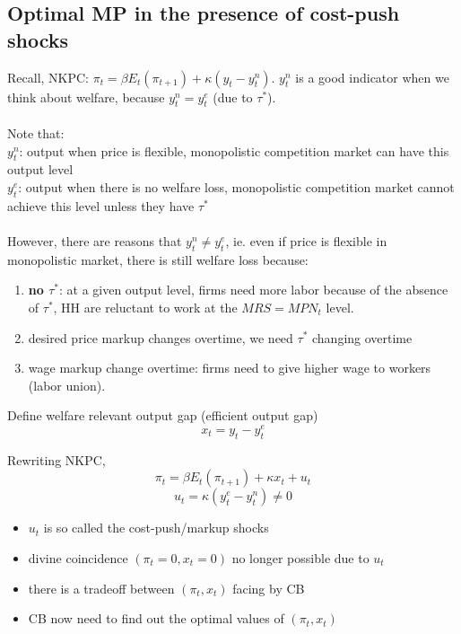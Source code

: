 \documentclass{article}
\begin{document}
\subsection{Optimal MP in the presence of cost-push shocks}
Recall, NKPC: $\pi_t = \beta E_t(\pi_{t+1}) + \kappa (y_t - y_t^n)$. $y_t^n$ is a good indicator when we think about welfare, because $y_t^n = y_t^e$ (due to $\tau^*$).\\
\\
\noindent Note that:\\
$y_t^n$: output when price is flexible, monopolistic competition market can have this output level\\
$y_t^e$: output when there is no welfare loss, monopolistic competition market cannot achieve this level unless they have $\tau^*$\\
\\
However, there are reasons that $y_t^n \neq y_t^e$, ie. even if price is flexible in monopolistic market, there is still welfare loss because:
\begin{enumerate}
    \item \textbf{no $\tau^*$}: at a given output level, firms need more labor because of the absence of $\tau^*$, HH are reluctant to work at the $MRS = MPN_t$ level.
    \item desired price markup changes overtime, we need $\tau^*$ changing overtime
    \item wage markup change overtime: firms need to give higher wage to workers (labor union).
\end{enumerate}

Define welfare relevant output gap (efficient output gap)
$$x_t = y_t - y_t^e$$

Rewriting NKPC,
$$\pi_t = \beta E_t(\pi_{t+1}) + \kappa x_t + u_t$$
$$u_t = \kappa (y_t^e - y_t^n) \neq 0$$
\begin{itemize}
    \item $u_t$ is so called the cost-push/markup shocks
    \item divine coincidence $(\pi_t = 0, x_t = 0)$ no longer possible due to $u_t$
    \item there is a tradeoff between $(\pi_t,x_t)$ facing by CB
    \item CB now need to find out the optimal values of $(\pi_t,x_t)$
\end{itemize}
\end{document}
